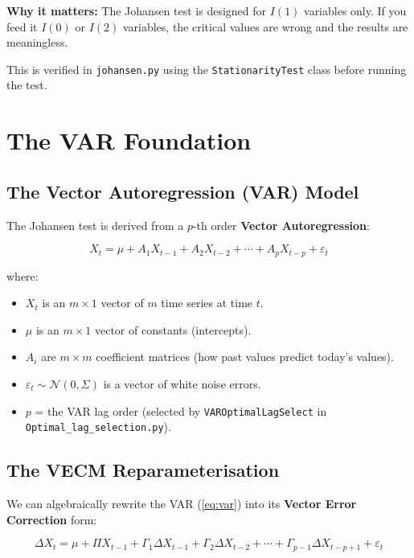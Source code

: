 \documentclass[12pt, a4paper]{article}
\begin{document}
\medskip
\textbf{Why it matters:} The Johansen test is designed for $I(1)$ variables only. 
If you feed it $I(0)$ or $I(2)$ variables, the critical values are wrong and the results are meaningless.

This is verified in \texttt{johansen.py} using the \texttt{StationarityTest} class before running the test.

\section{The VAR Foundation}

\subsection{The Vector Autoregression (VAR) Model}

The Johansen test is derived from a $p$-th order \textbf{Vector Autoregression}:

\begin{equation}
    X_t = \mu + A_1 X_{t-1} + A_2 X_{t-2} + \cdots + A_p X_{t-p} + \varepsilon_t
    \label{eq:var}
\end{equation}

where:
\begin{itemize}
    \item $X_t$ is an $m \times 1$ vector of $m$ time series at time $t$.
    \item $\mu$ is an $m \times 1$ vector of constants (intercepts).
    \item $A_i$ are $m \times m$ coefficient matrices (how past values predict today's values).
    \item $\varepsilon_t \sim \mathcal{N}(0, \Sigma)$ is a vector of white noise errors.
    \item $p$ = the VAR lag order (selected by \texttt{VAROptimalLagSelect} in \texttt{Optimal\_lag\_selection.py}).
\end{itemize}

\subsection{The VECM Reparameterisation}

We can algebraically rewrite the VAR (\ref{eq:var}) into its \textbf{Vector Error Correction} form:

\begin{equation}
    \boxed{
    \Delta X_t = \mu + \Pi X_{t-1} + \Gamma_1 \Delta X_{t-1} + \Gamma_2 \Delta X_{t-2} + 
    \cdots + \Gamma_{p-1} \Delta X_{t-p+1} + \varepsilon_t
    }
    \label{eq:vecm}
\end{equation}
\end{document}
